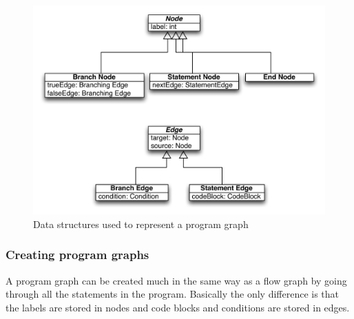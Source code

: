 \begin{figure}[h]
	\centering
	\includegraphics[scale=1.0]{../img/program_graph}
	\caption{Data structures used to represent a program graph}
	\label{fig:programgraph}
\end{figure}

\subsubsection{Creating program graphs}
A program graph can be created much in the same way as a flow graph by going through all the statements in the program. Basically the only difference is that the labels are stored in nodes and code blocks and conditions are stored in edges.